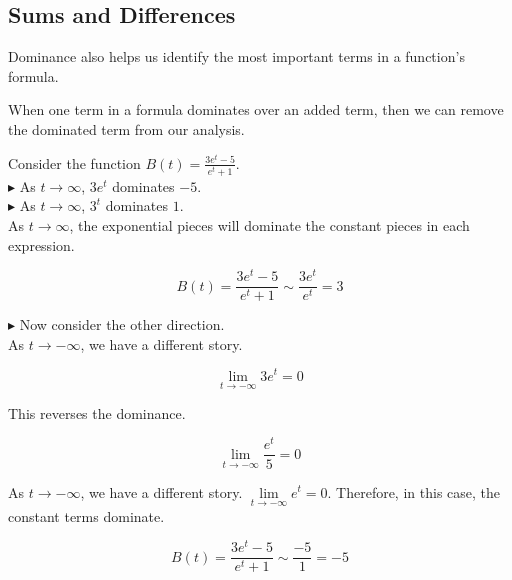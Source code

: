 \documentclass{ximera}
\begin{document}
\subsection{Sums and Differences}


Dominance also helps us identify the most important terms in a function's formula.


When one term in a formula dominates over an added term, then we can remove the dominated term from our analysis. \\






\begin{example}

Consider the function $B(t) = \frac{3e^t - 5}{e^t + 1}$. \\


$\blacktriangleright$ As $t \to \infty$, $3e^t$ dominates $-5$. \\

$\blacktriangleright$ As $t \to \infty$, $3^t$ dominates $1$. \\




As $t \to \infty$, the exponential pieces will dominate the constant pieces in each expression.  

\[   B(t) = \frac{3e^t - 5}{e^t + 1} \sim \frac{3 e^t}{e^t} = 3   \]




\textbf{\textcolor{blue!55!black}{$\blacktriangleright$}} Now consider the other direction. \\


As $t \to -\infty$, we have a different story.   



\[   \lim\limits_{t \to -\infty} 3 e^t  = 0  \]


This reverses the dominance.


\[   \lim\limits_{t \to -\infty} \frac{e^t}{5} = 0   \]



As $t \to -\infty$, we have a different story.  $\lim\limits_{t \to -\infty} e^t = 0$. Therefore, in this case, the constant terms dominate.


\[   B(t) = \frac{3e^t - 5}{e^t + 1} \sim \frac{-5}{1} = -5   \]








\end{example}
\end{document}
